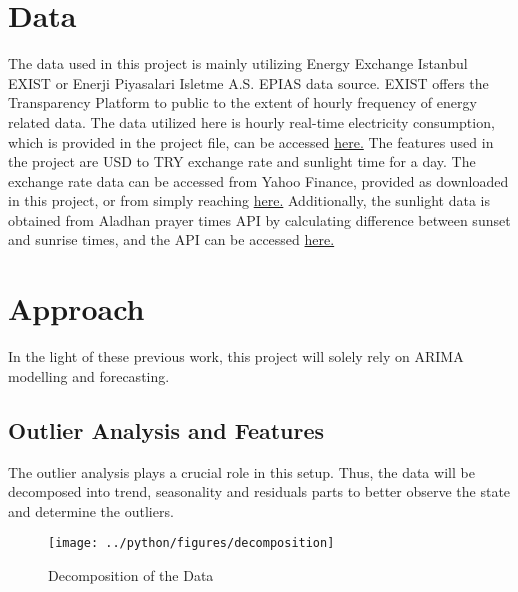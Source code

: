 \documentclass[11pt, a4paper, leqno]{article}
\begin{document}
\pagebreak
\section{Data} %
\label{sec:data}

The data used in this project is mainly utilizing Energy Exchange Istanbul EXIST or Enerji Piyasalari Isletme A.S. EPIAS data source. EXIST offers the Transparency Platform to public to the extent of hourly frequency of energy related data. The data utilized here is hourly real-time electricity consumption, which is provided in the project file, can be accessed \href{https://seffaflik.epias.com.tr/transparency/index.xhtml}{here.}
The features used in the project are USD to TRY exchange rate and sunlight time for a day. The exchange rate data can be accessed from Yahoo Finance, provided as downloaded in this project, or from simply reaching \href{https://finance.yahoo.com/quote/USDTRY%3DX/history?period1=1483228800&period2=1677542400&interval=1d&filter=history&frequency=1d&includeAdjustedClose=true}{here.} Additionally, the sunlight data is obtained from Aladhan prayer times API by calculating difference between sunset and sunrise times, and the API can be accessed \href{https://aladhan.com/prayer-times-api}{here.}



\section{Approach} %
\label{sec:appro}

In the light of these previous work, this project will solely rely on ARIMA modelling and forecasting.


\subsection{Outlier Analysis and Features}
\label{subsec:outlanaly}


The outlier analysis plays a crucial role in this setup. Thus, the data will be decomposed into trend, seasonality and residuals parts to better observe the state and determine the outliers.


\begin{figure}[H]

    \centering
    \texttt{[image: ../python/figures/decomposition]}

    \caption{Decomposition of the Data}
    \label{fig:daily_consumption}

\end{figure}
\end{document}
